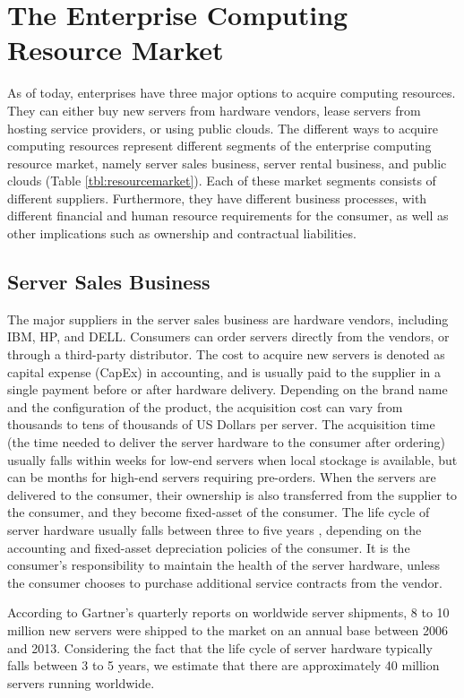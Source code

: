 \documentclass[10pt,journal,cspaper,compsoc]{IEEEtran}
\begin{document}
\section{The Enterprise Computing Resource Market}
\label{sec:market}

As of today, enterprises have three major options to acquire computing resources. They can either buy new servers from hardware vendors, lease servers from hosting service providers, or using public clouds. The different ways to acquire computing resources represent different segments of the enterprise computing resource market, namely server sales business, server rental business, and public clouds (Table \ref{tbl:resourcemarket}). Each of these market segments consists of different suppliers. Furthermore,  they have different business processes, with different financial and human resource requirements for the consumer, as well as other implications such as ownership and contractual liabilities. 

\subsection{Server Sales Business}
The major suppliers in the server sales business are hardware vendors, including IBM, HP, and DELL. Consumers can order servers directly from the vendors, or through a third-party distributor. The cost to acquire new servers is denoted as capital expense (CapEx) in accounting, and is usually paid to the supplier in a single payment before or after hardware delivery. Depending on the brand name and the configuration of the product, the acquisition cost can vary from thousands to tens of thousands of US Dollars per server. The acquisition time (the time needed to deliver the server hardware to the consumer after ordering) usually falls within weeks for low-end servers when local stockage is available, but can be months for high-end servers requiring pre-orders. When the servers are delivered to the consumer, their ownership is also transferred from the supplier to the consumer, and they become fixed-asset of the consumer. The life cycle of server hardware usually falls between three to five years \cite{Greenberg2008}, depending on the accounting and fixed-asset depreciation policies of the consumer. It is the consumer's responsibility to maintain the health of the server hardware, unless the consumer chooses to purchase additional service contracts from the vendor.

According to Gartner’s quarterly reports on worldwide server shipments, 8 to 10 million new servers were shipped to the market on an annual base between 2006 and 2013. Considering the fact that the life cycle of server hardware typically falls between 3 to 5 years, we estimate that there are approximately 40 million servers running worldwide. 
\end{document}
